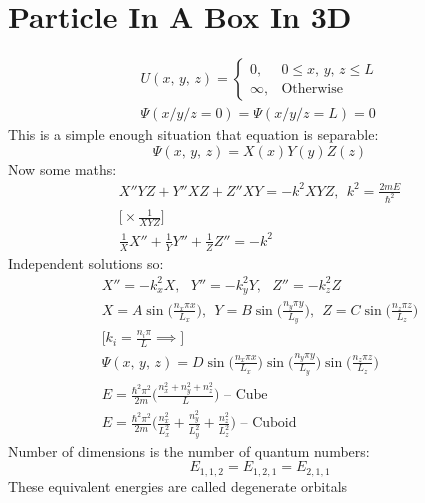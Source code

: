 \documentclass[a4paper, 11pt, fleqn, normalem]{report}
\begin{document}
\section{Particle In A Box In 3D}
\vspace{-22pt}
\begin{gather*}
    U(x,\,y,\,z) =
    \begin{cases}
        0, & 0 \leq x,\,y,\,z \leq L \\
        \infty, & \text{Otherwise}
    \end{cases} \\
    \Psi(x/y/z = 0) = \Psi(x/y/z = L) = 0
\end{gather*}
This is a simple enough situation that equation is separable:
\begin{equation*}
    \Psi(x,\,y,\,z) = X(x)Y(y)Z(z)
\end{equation*}
Now some maths:
\begin{gather*}
    X''YZ + Y''XZ + Z''XY = -k^{2}XYZ,~~k^{2} = \frac{2mE}{\hbar^{2}} \\
    \Big[\times \frac{1}{XYZ}\Big] \\
    \frac{1}{X}X'' + \frac{1}{Y}Y'' + \frac{1}{Z}Z'' = -k^{2}
\end{gather*}
Independent solutions so:
\begin{gather*}
    X'' = -k_{x}^{2}X,~~~Y'' = -k_{y}^{2}Y,~~~Z'' = -k_{z}^{2}Z \\
    X = A\sin\bigg(\frac{n_{x}\pi x}{L_{x}}\bigg),~~Y = B\sin\bigg(\frac{n_{y}\pi y}{L_{y}}\bigg),~~Z = C\sin\bigg(\frac{n_{z}\pi z}{L_{z}}\bigg) \\
    \bigg[k_{i} = \frac{n_{i}\pi}{L} \implies \bigg] \\
    \Psi(x,\,y,\,z) = D\sin\bigg(\frac{n_{x}\pi x}{L_{x}}\bigg)\sin\bigg(\frac{n_{y}\pi y}{L_{y}}\bigg)\sin\bigg(\frac{n_{z}\pi z}{L_{z}}\bigg) \\
    E = \frac{\hbar^{2}\pi^{2}}{2m}\Big(\frac{n_{x}^{2} + n_{y}^{2} + n_{z}^{2}}{L}\Big)\text{ -- Cube} \\
    E = \frac{\hbar^{2}\pi^{2}}{2m}\Big(\frac{n_{x}^{2}}{L_{x}^{2}} + \frac{n_{y}^{2}}{L_{y}^{2}} + \frac{n_{z}^{2}}{L_{z}^{2}}\Big)\text{ -- Cuboid}
\end{gather*}
Number of dimensions is the number of quantum numbers:
\begin{equation*}
    E_{1,1,2} = E_{1,2,1} = E_{2,1,1}
\end{equation*}
These equivalent energies are called degenerate orbitals
\end{document}
